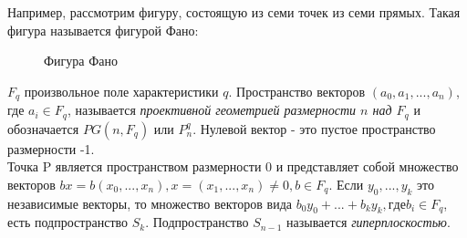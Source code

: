 \documentclass[12pt]{article}
\begin{document}
Например, рассмотрим фигуру, состоящую из семи точек из семи прямых. Такая фигура называется фигурой Фано:
\begin{figure}[h]
\caption {Фигура Фано}
\label{ris:image}
\end{figure}
\newline{} $F_q$  произвольное поле характеристики $q$. Пространство векторов $(a_0, a_1, . . . , a_n)$, где $a_i \in F_q$, называется \textit{проективной геометрией размерности $n$ над $F_q$} и обозначается $PG(n, F_q)$ или $P^q_n$. Нулевой вектор - это пустое пространство размерности -1.\\ Точка P является пространством размерности 0 и представляет собой
множество векторов $bx = b(x_0, . . . , x_n), x = (x_1, . . . , x_n) \neq 0, b \in F_q$.
Если $y_0, . . . , y_k$  это независимые векторы, то множество векторов
вида $b_0y_0 + ... + b_ky_k, где b_i \in F_q$, есть подпространство $S_k$. Подпространство $S_{n-1}$ называется \textit{гиперплоскостью}.
\end{document}
